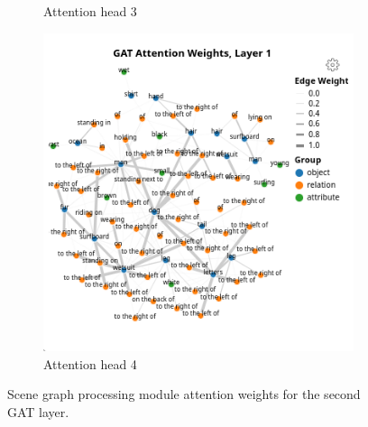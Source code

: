 \begin{figure}[htbp]
\begin{subfigure}[l]{0.49\textwidth}
        \caption{Attention head 3}
    \end{subfigure}
    \begin{subfigure}[r]{0.49\textwidth}
        \includegraphics[width=\textwidth]{figures/positive_logical/positive_logical_gat_l1_h3.png}
        \caption{Attention head 4}
    \end{subfigure}
    \caption[GAT second layer attention weights.]{Scene graph processing module attention weights for the second GAT layer.}
    \label{fig:positive_logical_gat_l1}
\end{figure}

